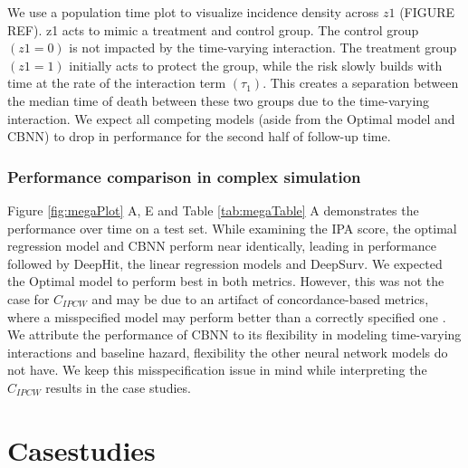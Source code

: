 \documentclass[APA,LATO1COL]{WileyNJD-v2}
\begin{document}
We use a population time plot to visualize incidence density across $z1$ (FIGURE REF).
z1 acts to mimic a treatment and control group. The control group $(z1=0)$ is not impacted
by the time-varying interaction. The treatment group $(z1=1)$ initially acts to protect the group,
while the risk slowly builds with time at the rate of the interaction term $(\tau_{1})$. This creates
a separation between the median time of death between these two groups due to the time-varying
interaction. We expect all competing models (aside from the Optimal model and CBNN) to drop in
performance for the second half of follow-up time.

\hypertarget{performance-comparison-in-complex-simulation}{%
\subsubsection{Performance comparison in complex
simulation}\label{performance-comparison-in-complex-simulation}}


Figure \ref{fig:megaPlot} A, E and Table \ref{tab:megaTable} A
demonstrates the performance over time on a test set. While examining the IPA score, the optimal
regression model and CBNN perform near identically, leading in performance followed by 
DeepHit, the linear regression models and DeepSurv. We expected the Optimal model to perform best in both
metrics. However, this was not the case for \(C_{IPCW}\) and may be due
to an artifact of concordance-based metrics, where a misspecified model
may perform better than a correctly specified one
\citep{cindexfails2019}. We attribute the performance of CBNN to its
flexibility in modeling time-varying interactions and baseline hazard,
flexibility the other neural network models do not have. We keep this misspecification issue
in mind while interpreting the \(C_{IPCW}\) results in the case studies.



\hypertarget{casestudies}{%
\section{Casestudies}\label{casestudies}}
\end{document}
